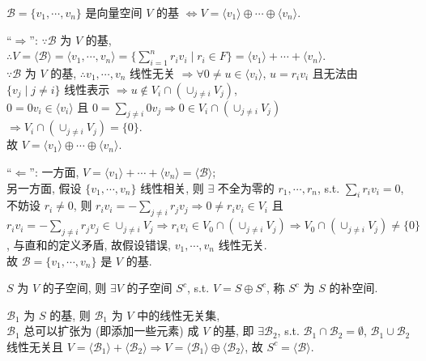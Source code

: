 \documentclass{note}
\begin{document}
\begin{thm}[(课本定理 1.8)]
    $\mathcal{B}=\{v_1,\cdots,v_n\}$ 是向量空间 $V$ 的基 $\Longleftrightarrow V=\langle v_1\rangle\oplus\cdots\oplus\langle v_n\rangle$.
\end{thm}
\begin{pf}
    ``$\Longrightarrow$'': $\because\mathcal{B}$ 为 $V$ 的基, $\therefore V=\langle\mathcal{B}\rangle=\langle v_1,\cdots,v_n\rangle=\{\sum_{i=1}^nr_iv_i\mid r_i\in F\}=\langle v_1\rangle+\cdots+\langle v_n\rangle$.\\
    $\because\mathcal{B}$ 为 $V$ 的基, $\therefore v_1,\cdots,v_n$ 线性无关 $\Longrightarrow\forall 0\neq u\in\langle v_i\rangle$, $u=r_iv_i$ 且无法由 $\{v_j\mid j\neq i\}$ 线性表示 $\Longrightarrow u\notin V_i\cap(\cup_{j\neq i}V_j)$,\\
    $0=0v_i\in\langle v_i\rangle$ 且 $0=\sum_{j\neq i}0v_j\Longrightarrow 0\in V_i\cap(\cup_{j\neq i}V_j)$\\
    $\Longrightarrow V_i\cap(\cup_{j\neq i}V_j)=\{0\}$.\\
    故 $V=\langle v_1\rangle\oplus\cdots\oplus\langle v_n\rangle$.

    ``$\Longleftarrow$'': 一方面, $V=\langle v_1\rangle+\cdots+\langle v_n\rangle=\langle\mathcal{B}\rangle$;\\
    另一方面, 假设 $\{v_1,\cdots,v_n\}$ 线性相关, 则 $\exists$ 不全为零的 $r_1,\cdots,r_n$, s.t. $\sum_{i}r_iv_i=0$,\\
    不妨设 $r_i\neq 0$, 则 $r_iv_i=-\sum_{j\neq i}r_jv_j\Longrightarrow 0\neq r_iv_i\in V_i$ 且 $r_iv_i=-\sum_{j\neq i}r_jv_j\in\cup_{j\neq i}V_j\Longrightarrow r_iv_i\in V_0\cap(\cup_{j\neq i}V_j)\Longrightarrow V_0\cap(\cup_{j\neq i}V_j)\neq\{0\}$, 与直和的定义矛盾, 故假设错误, $v_1,\cdots,v_n$ 线性无关.\\
    故 $\mathcal{B}=\{v_1,\cdots,v_n\}$ 是 $V$ 的基.
\end{pf}

\begin{thm}[(课本定理 1.4)]
    $S$ 为 $V$ 的子空间, 则 $\exists V$ 的子空间 $S^c$, s.t. $V=S\oplus S^c$, 称 $S^c$ 为 $S$ 的补空间.
\end{thm}
\begin{pf}
    $\mathcal{B}_1$ 为 $S$ 的基, 则 $\mathcal{B}_1$ 为 $V$ 中的线性无关集,\\
    $\mathcal{B}_1$ 总可以扩张为 (即添加一些元素) 成 $V$ 的基, 即 $\exists\mathcal{B}_2$, s.t. $\mathcal{B}_1\cap\mathcal{B}_2=\emptyset$, $\mathcal{B}_1\cup\mathcal{B}_2$ 线性无关且 $V=\langle\mathcal{B}_1\rangle+\langle\mathcal{B}_2\rangle\Longrightarrow V=\langle\mathcal{B}_1\rangle\oplus\langle\mathcal{B}_2\rangle$, 故 $S^c=\langle\mathcal{B}\rangle$.
\end{pf}
\end{document}
